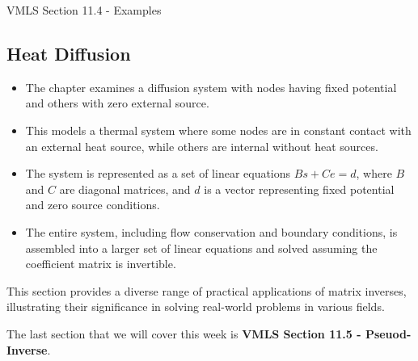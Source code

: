 \begin{notes}{VMLS Section 11.4 - Examples}
    \subsection*{Heat Diffusion}
    \begin{itemize}
        \item The chapter examines a diffusion system with nodes having fixed potential and others with zero external source.
        \item This models a thermal system where some nodes are in constant contact with an external heat source, while others are internal without heat sources.
        \item The system is represented as a set of linear equations $Bs + Ce = d$, where $B$ and $C$ are diagonal matrices, and $d$ is a vector representing fixed potential and zero source conditions.
        \item The entire system, including flow conservation and boundary conditions, is assembled into a larger set of linear equations and solved assuming the coefficient matrix is invertible.
    \end{itemize}

    This section provides a diverse range of practical applications of matrix inverses, illustrating their significance in solving real-world problems in various fields.
\end{notes}

The last section that we will cover this week is \textbf{VMLS Section 11.5 - Pseuod-Inverse}.


